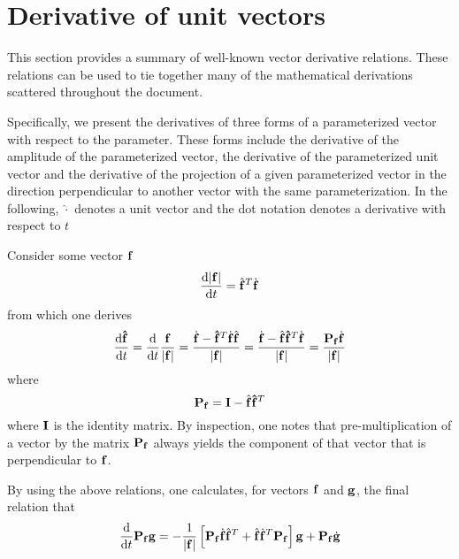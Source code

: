 \section{Derivative of unit vectors}
\label{an:vectorCalc}
This section provides a summary of well-known vector derivative relations. These relations can be used to tie together many of the mathematical derivations scattered throughout the document.
\par
Specifically, we present the derivatives of three forms of a parameterized vector with respect to the parameter. These forms include the derivative of the amplitude of the parameterized vector, the derivative of the parameterized unit vector and the derivative of the projection of a given parameterized vector in the direction perpendicular to another vector with the same parameterization. In the following, $\hat{\cdot}$ denotes a unit vector and the dot notation denotes a derivative with respect to $t$
\par
Consider some vector $\mathbf{f}$
\begin{equation}
 \frac{\text{d}{\lvert\ensuremath{\mathbf{f}}\rvert}}{\text{d}{t}} = \hat{\mathbf{f}}^T\dot{\mathbf{f}}
\end{equation}
from which one derives
\begin{equation}
 \frac{\d{\vct{\hat{f}}}}{\d{t}} = \frac{\d{}}{\d{t}}\frac{\vct{f}}{\lvert\vct{f}\rvert} 
 = \frac{\dot{\vct{f}} - \vct{\hat{f}}^T\dot{\vct{f}}\hat{\vct{f}}}{\lvert\vct{f}\rvert}
 = \frac{\dot{\vct{f}} - \hat{\vct{f}}\vct{\hat{f}}^T\dot{\vct{f}}}{\lvert\vct{f}\rvert}
 = \frac{\mtx{P}_\vct{f}\dot{\vct{f}}}{\lvert\vct{f}\rvert}
\end{equation}
where
\begin{equation}
 \mtx{P}_\vct{f} = \mtx{I} - \hat{\vct{f}}\vct{\hat{f}}^T
\end{equation}
where $\mtx{I}$ is the identity matrix. By inspection, one notes that pre-multiplication of a vector by the matrix $\mtx{P}_\vct{f}$ always yields the component of that vector that is perpendicular to $\mathbf{f}$.
\par
By using the above relations, one calculates, for vectors $\mathbf{f}$ and $\mathbf{g}$, the final relation that
\begin{equation}
 \frac{\d{}}{\d{t}}\Pf\vct{g} = -\frac{1}{\lvert\vct{f}\rvert}\left[\Pf\df\uf^T + \uf\df^T\Pf\right]\vct{g} + \Pf\dot{\vct{g}}
\end{equation}

